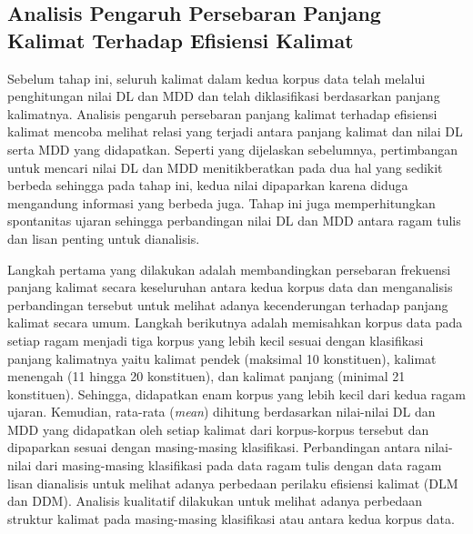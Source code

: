 \subsection{Analisis Pengaruh Persebaran Panjang Kalimat Terhadap Efisiensi Kalimat}
Sebelum tahap ini, seluruh kalimat dalam kedua korpus data telah melalui penghitungan nilai DL dan MDD dan telah diklasifikasi berdasarkan panjang kalimatnya. Analisis pengaruh persebaran panjang kalimat terhadap efisiensi kalimat mencoba melihat relasi yang terjadi antara panjang kalimat dan nilai DL serta MDD yang didapatkan. Seperti yang dijelaskan sebelumnya, pertimbangan untuk mencari nilai DL dan MDD menitikberatkan pada dua hal yang sedikit berbeda sehingga pada tahap ini, kedua nilai dipaparkan karena diduga mengandung informasi yang berbeda juga. Tahap ini juga memperhitungkan spontanitas ujaran sehingga perbandingan nilai DL dan MDD antara ragam tulis dan lisan penting untuk dianalisis. 

Langkah pertama yang dilakukan adalah membandingkan persebaran frekuensi panjang kalimat secara keseluruhan antara kedua korpus data dan menganalisis perbandingan tersebut untuk melihat adanya kecenderungan terhadap panjang kalimat secara umum. Langkah berikutnya adalah memisahkan korpus data pada setiap ragam menjadi tiga korpus yang lebih kecil sesuai dengan klasifikasi panjang kalimatnya yaitu kalimat pendek (maksimal 10 konstituen), kalimat menengah (11 hingga 20 konstituen), dan kalimat panjang (minimal 21 konstituen). Sehingga, didapatkan enam korpus yang lebih kecil dari kedua ragam ujaran. Kemudian, rata-rata (\textit{mean}) dihitung berdasarkan nilai-nilai DL dan MDD yang didapatkan oleh setiap kalimat dari korpus-korpus tersebut dan dipaparkan sesuai dengan masing-masing klasifikasi. Perbandingan antara nilai-nilai dari masing-masing klasifikasi pada data ragam tulis dengan data ragam lisan dianalisis untuk melihat adanya perbedaan perilaku efisiensi kalimat (DLM dan DDM). Analisis kualitatif dilakukan untuk melihat adanya perbedaan struktur kalimat pada masing-masing klasifikasi atau antara kedua korpus data.


